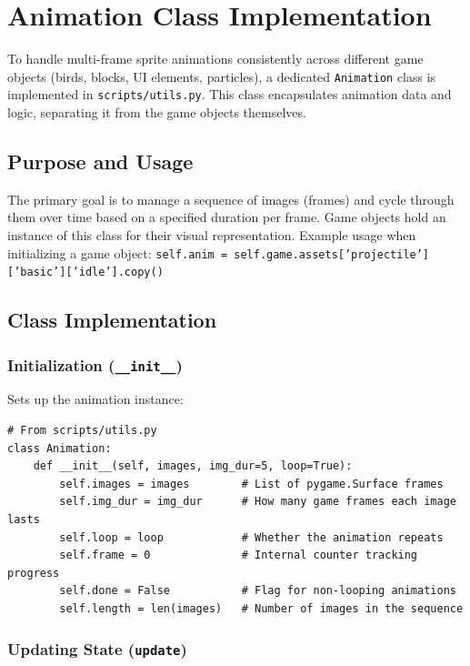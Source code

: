 \documentclass[11pt, a4paper]{article}
\begin{document}
\section{Animation Class Implementation}
\label{app:animation}

To handle multi-frame sprite animations consistently across different game objects (birds, blocks, UI elements, particles), a dedicated \texttt{Animation} class is implemented in \texttt{scripts/utils.py}. This class encapsulates animation data and logic, separating it from the game objects themselves.

\subsection{Purpose and Usage}

The primary goal is to manage a sequence of images (frames) and cycle through them over time based on a specified duration per frame. Game objects hold an instance of this class for their visual representation. Example usage when initializing a game object:
\texttt{self.anim = self.game.assets['projectile']['basic']['idle'].copy()}

\subsection{Class Implementation}

\subsubsection{Initialization (\texttt{\_\_init\_\_})}

Sets up the animation instance:

\begin{lstlisting}[caption={Animation Class \_\_init\_\_ Snippet}, label={lst:animation_init}]
# From scripts/utils.py
class Animation:
    def __init__(self, images, img_dur=5, loop=True):
        self.images = images        # List of pygame.Surface frames
        self.img_dur = img_dur      # How many game frames each image lasts
        self.loop = loop            # Whether the animation repeats
        self.frame = 0              # Internal counter tracking progress
        self.done = False           # Flag for non-looping animations
        self.length = len(images)   # Number of images in the sequence
\end{lstlisting}

\subsubsection{Updating State (\texttt{update})}
\end{document}
